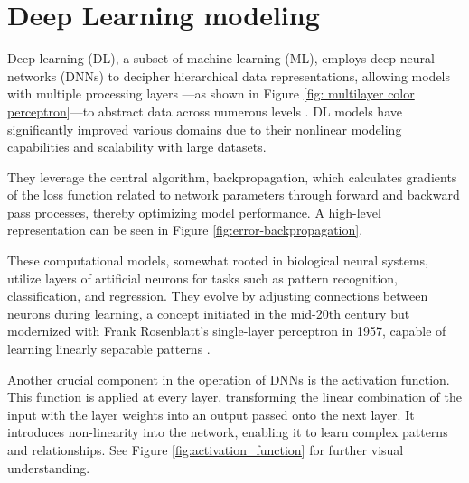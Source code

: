 \section{Deep Learning modeling}

Deep learning (DL), a subset of machine learning (ML), employs deep neural networks (DNNs) to decipher hierarchical data representations, allowing models with multiple processing layers ---as shown in Figure \ref{fig: multilayer color perceptron}---to abstract data across numerous levels \cite{LeCun2015DeepLearning, Sarker2021DeepDirections}. DL models have significantly improved various domains due to their nonlinear modeling capabilities and scalability with large datasets.

They leverage the central algorithm, backpropagation, which calculates gradients of the loss function related to network parameters through forward and backward pass processes, thereby optimizing model performance. A high-level representation can be seen in Figure \ref{fig:error-backpropagation}.



These computational models, somewhat rooted in biological neural systems, utilize layers of artificial neurons for tasks such as pattern recognition, classification, and regression. They evolve by adjusting connections between neurons during learning, a concept initiated in the mid-20th century but modernized with Frank Rosenblatt's single-layer perceptron in 1957, capable of learning linearly separable patterns \cite{perceptron}.



Another crucial component in the operation of DNNs is the activation function. This function is applied at every layer, transforming the linear combination of the input with the layer weights into an output passed onto the next layer. It introduces non-linearity into the network, enabling it to learn complex patterns and relationships. See Figure \ref{fig:activation_function} for further visual understanding.



\newpage